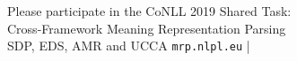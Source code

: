 \documentclass[extrafontsizes,60pt,twocolumn]{memoir}
\begin{document}
\begin{minipage}{.42\columnwidth}
\color{DarkSlateGray}
\tiny
\setlength\bibitemsep{0pt}


\end{minipage}
\hspace{.3in}
\begin{minipage}{.475\columnwidth}
\color{Black}
\begin{adjustbox}{margin=3mm,padding=9mm,frame,minipage=1.15\columnwidth}
\centering\Large
Please participate in the CoNLL 2019 Shared Task: \\
Cross-Framework Meaning Representation Parsing \\
\quad SDP, EDS, AMR and UCCA \hfill
\Large\texttt{{\color{violet}mrp}.{\color{red}nlpl}.{\color{blue}eu}}
\hfill {\color{white}|}
\end{adjustbox}
\end{minipage}
\end{document}
